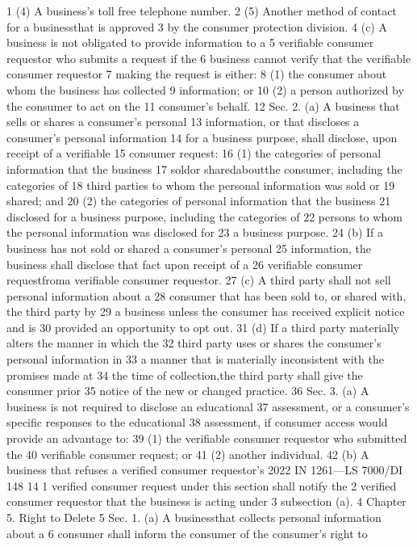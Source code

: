 1 (4) A business's toll free telephone number.
2 (5) Another method of contact for a businessthat is approved
3 by the consumer protection division.
4 (c) A business is not obligated to provide information to a
5 verifiable consumer requestor who submits a request if the
6 business cannot verify that the verifiable consumer requestor
7 making the request is either:
8 (1) the consumer about whom the business has collected
9 information; or
10 (2) a person authorized by the consumer to act on the
11 consumer's behalf.
12 Sec. 2. (a) A business that sells or shares a consumer's personal
13 information, or that discloses a consumer's personal information
14 for a business purpose, shall disclose, upon receipt of a verifiable
15 consumer request:
16 (1) the categories of personal information that the business
17 soldor sharedaboutthe consumer, including the categories of
18 third parties to whom the personal information was sold or
19 shared; and
20 (2) the categories of personal information that the business
21 disclosed for a business purpose, including the categories of
22 persons to whom the personal information was disclosed for
23 a business purpose.
24 (b) If a business has not sold or shared a consumer's personal
25 information, the business shall disclose that fact upon receipt of a
26 verifiable consumer requestfroma verifiable consumer requestor.
27 (c) A third party shall not sell personal information about a
28 consumer that has been sold to, or shared with, the third party by
29 a business unless the consumer has received explicit notice and is
30 provided an opportunity to opt out.
31 (d) If a third party materially alters the manner in which the
32 third party uses or shares the consumer's personal information in
33 a manner that is materially inconsistent with the promises made at
34 the time of collection,the third party shall give the consumer prior
35 notice of the new or changed practice.
36 Sec. 3. (a) A business is not required to disclose an educational
37 assessment, or a consumer's specific responses to the educational
38 assessment, if consumer access would provide an advantage to:
39 (1) the verifiable consumer requestor who submitted the
40 verifiable consumer request; or
41 (2) another individual.
42 (b) A business that refuses a verified consumer requestor's
2022 IN 1261—LS 7000/DI 148
14
1 verified consumer request under this section shall notify the
2 verified consumer requestor that the business is acting under
3 subsection (a).
4 Chapter 5. Right to Delete
5 Sec. 1. (a) A businessthat collects personal information about a
6 consumer shall inform the consumer of the consumer's right to
